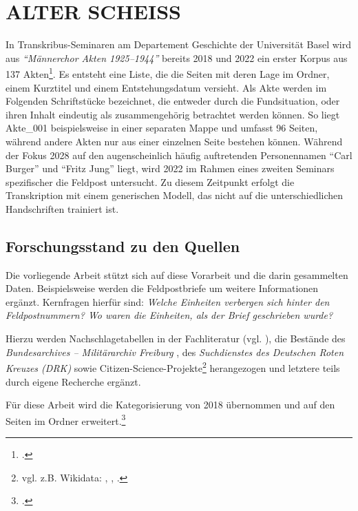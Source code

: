 \documentclass[12pt, a4paper, ngerman, bidi=default]{article}
\let\cite\footcite
\begin{document}
\begingroup
\small
\pagecolor{OldPaper}
\section{ALTER SCHEISS}

In Transkribus-Seminaren am Departement Geschichte der Universität Basel wird aus \textit{\enquote{Männerchor Akten 1925--1944}} bereits 2018 und 2022 ein 
erster Korpus aus 137 Akten\cite[Weiterführend vgl.][]{burkhardt_feldpost_2022}. Es entsteht eine Liste, die die Seiten mit deren Lage im Ordner, einem Kurztitel und einem Entstehungsdatum versieht. Als Akte werden im Folgenden Schriftstücke bezeichnet, die entweder durch die Fundsituation, 
oder  ihren Inhalt eindeutig als zusammengehörig betrachtet werden können. So liegt Akte\_001 beispielsweise in einer separaten Mappe und umfasst 96 Seiten, 
während andere Akten nur aus einer einzelnen Seite bestehen können.  
Während der Fokus 2028 auf den augenscheinlich häufig auftretenden Personennamen \enquote{Carl Burger} und \enquote{Fritz Jung} liegt, wird 2022 im Rahmen eines zweiten Seminars spezifischer die Feldpost untersucht.
Zu diesem Zeitpunkt erfolgt die Transkription mit einem generischen Modell, das nicht auf die unterschiedlichen Handschriften trainiert 
ist.
\subsection{Forschungsstand zu den Quellen}
Die vorliegende Arbeit stützt sich auf diese Vorarbeit und die darin gesammelten Daten. Beispielsweise werden die Feldpostbriefe um weitere Informationen ergänzt. Kernfragen hierfür sind: \textit{Welche Einheiten verbergen sich hinter den Feldpostnummern? Wo waren die Einheiten, als der Brief geschrieben wurde?}

Hierzu werden Nachschlagetabellen in der Fachliteratur (vgl. \autocites{tessin_verbande_1977}{hartmann_wehrmacht_2010}{rass_deutsche_2009}), die Bestände des \textit{Bundesarchives – Militärarchiv Freiburg} \autocite{hollmann_freiburg_2025}, des \textit{Suchdienstes des Deutschen Roten Kreuzes (DRK)} \autocite{reuter_drk_2025} sowie Citizen-Science-Projekte\footnote{ vgl. z.B. Wikidata: \autocite{burkhardt_78th_2024}, \autocite{altenburger_lexikon_nodate-1}, \autocite{hermans_forum_nodate}.} herangezogen und letztere teils durch eigene Recherche ergänzt.


Für diese Arbeit wird die Kategorisierung von 2018 übernommen und auf den Seiten im Ordner erweitert.\cite[vgl.][]{burkhardt_githubakten_gesamtubersichtcsv_2025} 
\end{document}
